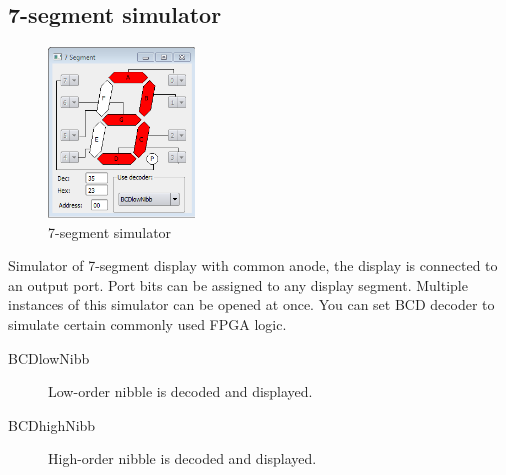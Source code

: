     \subsection{7-segment simulator}
        \begin{figure}
            \centering
            \includegraphics[width=110pt]{img/7seg_sim.png}
            \caption{7-segment simulator}
        \end{figure}
        Simulator of 7-segment display with common anode, the display is connected to an output port. Port bits can be
        assigned to any display segment. Multiple instances of this simulator can be opened at once. You can set BCD decoder to simulate certain commonly used FPGA logic.

        \begin{description}
            \item[BCDlowNibb] Low-order nibble is decoded and displayed.
            \item[BCDhighNibb] High-order nibble is decoded and displayed.
        \end{description}

